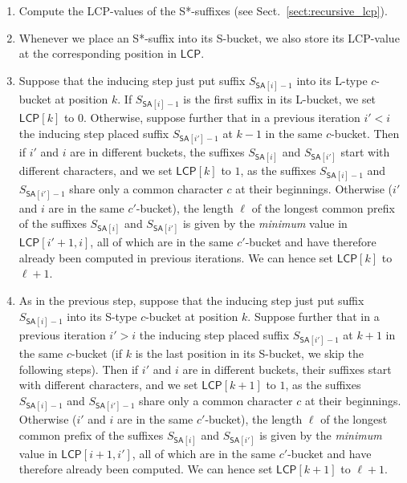 \documentclass[11pt,onecolumn,final]{article} \usepackage[latin1]{inputenc}
\newcommand{\LCP}[0]{\mathsf{LCP}}
\newcommand{\SA}[0]{\mathsf{SA}}
\newcommand{\SF}[1]{S_{#1}}
\theoremstyle{plain}
\theoremstyle{remark}
\begin{document}
\begin{enumerate}[1$'$.]
\item Compute the LCP-values of the S*-suffixes (see Sect.~\ref{sect:recursive_lcp}).
\item Whenever we place an S*-suffix into its S-bucket, we also store its LCP-value at the corresponding position in $\LCP$.
\item Suppose that the inducing step just put suffix $\SF{\SA[i]-1}$ into its L-type $c$-bucket at position $k$. If $\SF{\SA[i]-1}$ is the first suffix in its L-bucket, we set $\LCP[k]$ to $0$. Otherwise, suppose further that in a previous iteration $i'<i$ the inducing step placed suffix $\SF{\SA[i']-1}$ at $k-1$ in the same $c$-bucket. Then if $i'$ and $i$ are in different buckets, the suffixes $\SF{\SA[i]}$ and $\SF{\SA[i']}$ start with different characters, and we set $\LCP[k]$ to $1$, as the suffixes $\SF{\SA[i]-1}$ and $\SF{\SA[i']-1}$ share only a common character $c$ at their beginnings. Otherwise ($i'$ and $i$ are in the same $c'$-bucket), the length $\ell$ of the longest common prefix of the suffixes $\SF{\SA[i]}$ and $\SF{\SA[i']}$ is given by the \emph{minimum} value in $\LCP[i'+1,i]$, all of which are in the same $c'$-bucket and have therefore already been computed in previous iterations. We can hence set $\LCP[k]$ to $\ell+1$. 
\item As in the previous step, suppose that the inducing step just put suffix $\SF{\SA[i]-1}$ into its S-type $c$-bucket at position $k$. Suppose further that in a previous iteration $i'>i$ the inducing step placed suffix $\SF{\SA[i']-1}$ at $k+1$ in the same $c$-bucket (if $k$ is the last position in its S-bucket, we skip the following steps). Then if $i'$ and $i$ are in different buckets, their suffixes start with different characters, and we set $\LCP[k+1]$ to $1$, as the suffixes $\SF{\SA[i]-1}$ and $\SF{\SA[i']-1}$ share only a common character $c$ at their beginnings. Otherwise ($i'$ and $i$ are in the same $c'$-bucket), the length $\ell$ of the longest common prefix of the suffixes $\SF{\SA[i]}$ and $\SF{\SA[i']}$ is given by the \emph{minimum} value in $\LCP[i+1,i']$, all of which are in the same $c'$-bucket and have therefore already been computed. We can hence set $\LCP[k+1]$ to $\ell+1$. 
\end{enumerate}
\end{document}
